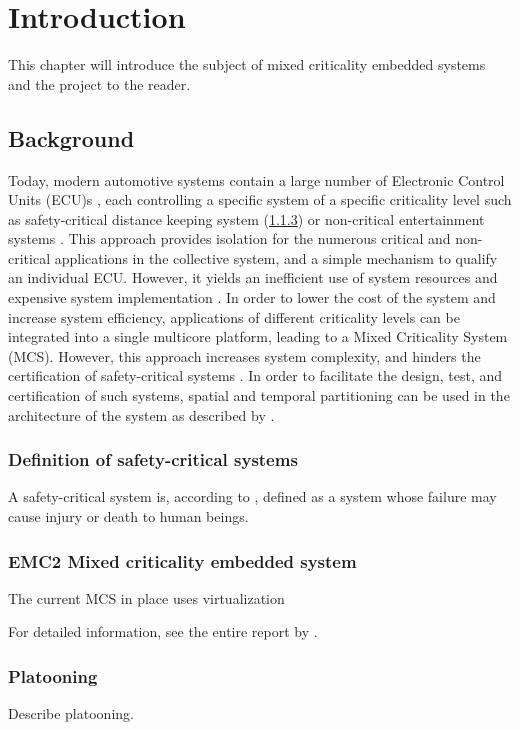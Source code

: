 \chapter{Introduction}
\label{sec:introduction}
This chapter will introduce the subject of mixed criticality embedded systems and the project to the reader.

\section{Background}
Today, modern automotive systems contain a large number of Electronic Control Units (ECU)s \cite{}, each controlling a specific system of a specific criticality level such as safety-critical distance keeping system (\ref{sec:platooning}) or non-critical entertainment systems \cite{}. This approach provides isolation for the numerous critical and non-critical applications in the collective system, and a simple mechanism to qualify an individual ECU. However, it yields an inefficient use of system resources \cite{} and expensive system implementation \cite{}. In order to lower the cost of the system and increase system efficiency, applications of different criticality levels can be integrated into a single multicore platform, leading to a Mixed Criticality System (MCS). However, this approach increases system complexity, and hinders the certification of safety-critical systems \cite{}. In order to facilitate the design, test, and certification of such systems, spatial and temporal partitioning can be used in the architecture of the system as described by \cite{zaki2016}.

\subsection{Definition of safety-critical systems}
A safety-critical system is, according to \cite{}, defined as a system whose failure may cause injury or death to human beings.

\subsection{EMC2 Mixed criticality embedded system}
\label{sec:mces}
The current MCS in place uses virtualization

For detailed information, see the entire report by \cite{zaki2016}.

\subsection{Platooning}
\label{sec:platooning}
Describe platooning.

